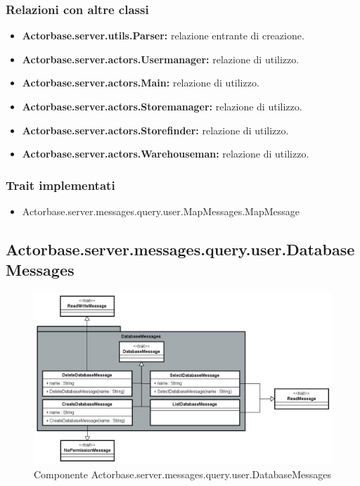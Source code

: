 \documentclass[a4paper]{article}
\begin{document}
			\subsubsection{Relazioni con altre classi}
				\begin{itemize}
					\item \textbf{Actorbase.server.utils.Parser:} relazione entrante di creazione.
					\item \textbf{Actorbase.server.actors.Usermanager:} relazione di utilizzo.
					\item \textbf{Actorbase.server.actors.Main:} relazione di utilizzo.
					\item \textbf{Actorbase.server.actors.Storemanager:} relazione di utilizzo.
					\item \textbf{Actorbase.server.actors.Storefinder:} relazione di utilizzo.
					\item \textbf{Actorbase.server.actors.Warehouseman:} relazione di utilizzo.
				\end{itemize}
			\subsubsection{Trait implementati}
				\begin{itemize}
					\item Actorbase.server.messages.query.user.MapMessages.MapMessage
				\end{itemize}
				
		\subsection{Actorbase.server.messages.query.user.DatabaseMessages}
		
			\begin{figure}[H]
				\centering
				\includegraphics[width=\textwidth]{ST/Server/databaseMessagesLevel.jpg}
				\caption{Componente Actorbase.server.messages.query.user.DatabaseMessages}
			\end{figure}
			
\end{document}
